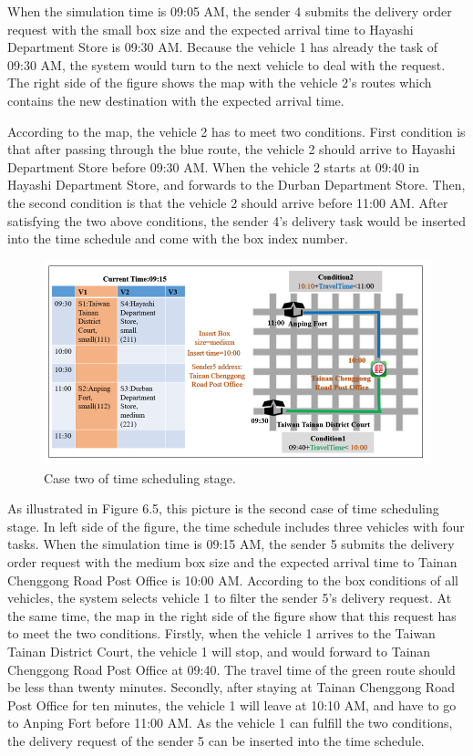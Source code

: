 \documentclass[12pt]{ksthesis}
\begin{document}
\begin{thesis}
{When the simulation time is 09:05 AM, the sender 4 submits the delivery order request with the small box size and the expected arrival time to Hayashi Department Store is 09:30 AM. Because the vehicle 1 has already the task of 09:30 AM, the system would turn to the next vehicle to deal with the request.
The right side of the figure shows the map with the vehicle 2’s routes which contains the new destination with the expected arrival time.

According to the map, the vehicle 2 has to meet two conditions. First condition is that after passing through the blue route, the vehicle 2 should arrive to Hayashi Department Store before 09:30 AM. 
When the vehicle 2 starts at 09:40 in Hayashi Department Store, and forwards to the Durban Department Store. Then, the second condition is that the vehicle 2 should arrive before 11:00 AM.
After satisfying the two above conditions, the sender 4’s delivery task would be inserted into the time schedule and come with the box index number. 

\begin{figure}[t]
\centering
\includegraphics[width=1.0\textwidth]{./Thesis_figures/F6-5_caseTwo_SchedulingStage.PNG}
\caption{\large Case two of time scheduling stage.}
\vspace{0.5cm}
\label{Fig:CaseTwo_TimeFiltering}
\end{figure}

As illustrated in Figure 6.5, this picture is the second case of time scheduling stage. In left side of the figure, the time schedule includes three vehicles with four tasks. When the simulation time is 09:15 AM, the sender 5 submits the delivery order request with the medium box size and the expected arrival time to Tainan Chenggong Road Post Office is 10:00 AM.
According to the box conditions of all vehicles, the system selects vehicle 1 to filter the sender 5’s delivery request. At the same time, the map in the right side of the figure show that this request has to meet the two conditions. Firstly, when the vehicle 1 arrives to the Taiwan Tainan District Court, the vehicle 1 will stop, and would forward to Tainan Chenggong Road Post Office at 09:40. The travel time of the green route should be less than twenty minutes. Secondly, after staying at Tainan Chenggong Road Post Office for ten minutes, the vehicle 1 will leave at 10:10 AM, and have to go to Anping Fort before 11:00 AM. 
As the vehicle 1 can fulfill the two conditions, the delivery request of the sender 5 can be inserted into the time schedule.




}
\end{thesis}
\end{document}
